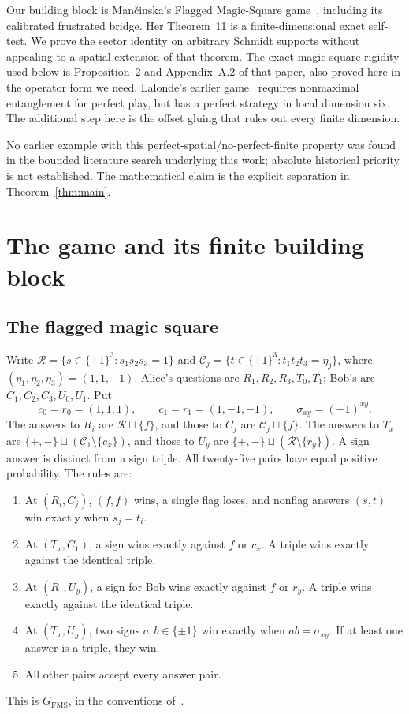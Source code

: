 \documentclass[11pt]{article}
\theoremstyle{definition}
\newcommand{\FMS}{G_{\mathrm{FMS}}}
\newcommand{\sq}{\sqcup}
\begin{document}
Our building block is Man\v{c}inska's Flagged Magic-Square game~\cite{Mancinska}, including its calibrated frustrated bridge. Her Theorem~11 is a finite-dimensional exact self-test. We prove the sector identity on arbitrary Schmidt supports without appealing to a spatial extension of that theorem. The exact magic-square rigidity used below is Proposition~2 and Appendix~A.2 of that paper, also proved here in the operator form we need. Lalonde's earlier game~\cite{Lalonde} requires nonmaximal entanglement for perfect play, but has a perfect strategy in local dimension six. The additional step here is the offset gluing that rules out every finite dimension.

No earlier example with this perfect-spatial/no-perfect-finite property was found in the bounded literature search underlying this work; absolute historical priority is not established. The mathematical claim is the explicit separation in Theorem~\ref{thm:main}.

\section{The game and its finite building block}\label{sec:game}
\subsection{The flagged magic square}
Write $\mathcal R=\{s\in\{\pm1\}^3:s_1s_2s_3=1\}$ and
$\mathcal C_j=\{t\in\{\pm1\}^3:t_1t_2t_3=\eta_j\}$, where $(\eta_1,\eta_2,\eta_3)=(1,1,-1)$. Alice's questions are $R_1,R_2,R_3,T_0,T_1$; Bob's are $C_1,C_2,C_3,U_0,U_1$. Put
\[
c_0=r_0=(1,1,1),\qquad c_1=r_1=(1,-1,-1),\qquad \sigma_{xy}=(-1)^{xy}.
\]
The answers to $R_i$ are $\mathcal R\sq\{f\}$, and those to $C_j$ are $\mathcal C_j\sq\{f\}$. The answers to $T_x$ are $\{+,-\}\sq(\mathcal C_1\setminus\{c_x\})$, and those to $U_y$ are $\{+,-\}\sq(\mathcal R\setminus\{r_y\})$. A sign answer is distinct from a sign triple. All twenty-five pairs have equal positive probability. The rules are:
\begin{enumerate}
\item At $(R_i,C_j)$, $(f,f)$ wins, a single flag loses, and nonflag answers $(s,t)$ win exactly when $s_j=t_i$.
\item At $(T_x,C_1)$, a sign wins exactly against $f$ or $c_x$. A triple wins exactly against the identical triple.
\item At $(R_1,U_y)$, a sign for Bob wins exactly against $f$ or $r_y$. A triple wins exactly against the identical triple.
\item At $(T_x,U_y)$, two signs $a,b\in\{\pm1\}$ win exactly when $ab=\sigma_{xy}$. If at least one answer is a triple, they win.
\item All other pairs accept every answer pair.
\end{enumerate}
This is $\FMS$, in the conventions of~\cite{Mancinska}.
\end{document}
